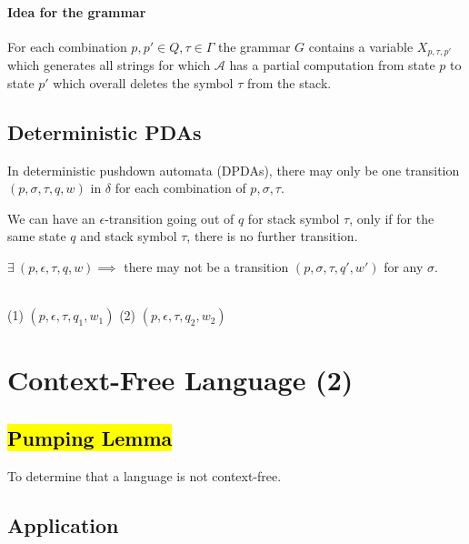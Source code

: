 \documentclass[a3paper, 8pt]{extarticle}
\begin{document}
\begin{multicols*}{6}
\paragraph{Idea for the grammar} For each combination $p,p' \in Q, \tau \in \Gamma$ the grammar $G$ contains a variable $X_{p,\tau , p'}$ which generates all strings for which $\mathcal{A}$ has a partial computation from state $p$ to state $p'$ which overall deletes the symbol $\tau$ from the stack.

\subsection{Deterministic PDAs}

 In deterministic pushdown automata (DPDAs), there may only be one transition $(p, \sigma, \tau, q, w)$ in $\delta$ for each combination of $p,\sigma, \tau$.

We can have an $\epsilon$-transition going out of $q$ for stack symbol $\tau$, only if for the same state $q$ and stack symbol $\tau$, there is no further transition.  

$\exists \ (p, \epsilon, \tau, q ,w) \implies$ there may not be a transition $(p, \sigma, \tau, q', w')$ for any $\sigma$. 

\\(1) $(p, \epsilon, \tau, q_1, w_1)$
    (2) $(p, \epsilon, \tau, q_2, w_2)$


\section{Context-Free Language (2)} 

\subsection{\hl{Pumping Lemma}} To determine that a language is not context-free.

\subsection{Application}


\end{multicols*}
\end{document}
